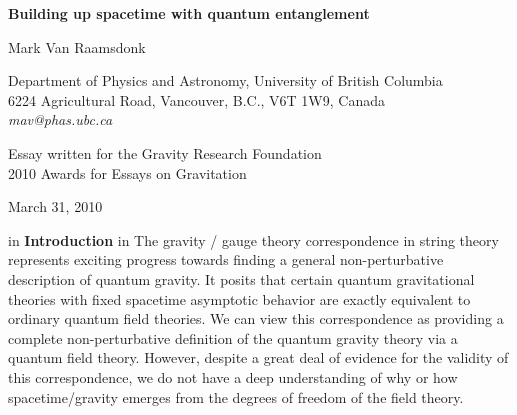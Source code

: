 \documentclass[12pt,epsf]{article}
\renewcommand{\(}{\left(}
\renewcommand{\)}{\right)}
\begin{document}
\begin{titlepage}
\hfill

\vspace*{20mm}
\begin{center}
{\Large \bf Building up spacetime with quantum entanglement}

\vspace*{15mm}
\vspace*{1mm}

Mark Van Raamsdonk

\vspace*{1cm}

{Department of Physics and Astronomy,
University of British Columbia\\
6224 Agricultural Road,
Vancouver, B.C., V6T 1W9, Canada\\
{\it mav@phas.ubc.ca}
}

\vspace*{1cm}
\end{center}

\begin{abstract}
In this essay, we argue that the emergence of classically connected spacetimes is intimately related to the quantum entanglement of degrees of freedom in a non-perturbative description of quantum gravity. Disentangling the degrees of freedom associated with two regions of spacetime results in these regions pulling apart and pinching off from each other in a way that can be quantified by standard measures of entanglement.

\end{abstract}
\vskip 2cm

\begin{center}
Essay written for the Gravity Research Foundation \\ 2010 Awards for Essays on Gravitation
\vskip 1cm

March 31, 2010
\end{center}
\end{titlepage}

\vskip 1cm
 in
\noindent
{\bf Introduction}
 in
\noindent
The gravity / gauge theory correspondence \cite{bfss, malda,agmoo} in string theory represents exciting progress towards finding a general non-perturbative description of quantum gravity. It posits that certain quantum gravitational theories with fixed spacetime asymptotic behavior are exactly equivalent to ordinary quantum field theories. We can view this correspondence as providing a complete non-perturbative definition of the quantum gravity theory via a quantum field theory. However, despite a great deal of evidence for the validity of this correspondence, we do not have a deep understanding of why or how spacetime/gravity emerges from the degrees of freedom of the field theory.
\end{document}

